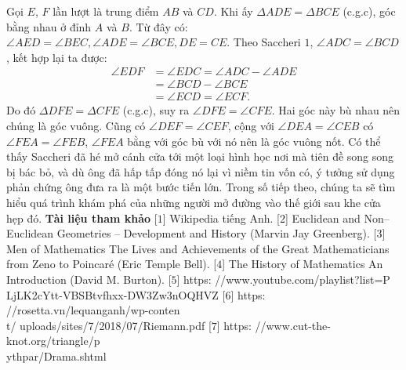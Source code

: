 \begin{multicols}{2}
\begin{figure}[H]
		\vspace*{-10pt}
	\end{figure}
	Gọi $E$, $F$ lần lượt là trung điểm $AB$ và $CD$. Khi ấy $\Delta ADE = \Delta BCE$ (c.g.c), góc bằng nhau ở đỉnh $A$ và $B$. Từ đây có: $ \angle AED = \angle BEC, \angle ADE = \angle BCE, DE = CE$. Theo Saccheri $1$, $ \angle ADC = \angle BCD$, kết hợp lại ta được:
	\begin{align*}
		\angle EDF &= \angle EDC = \angle ADC - \angle ADE \\
		&= \angle BCD - \angle BCE \\
		&= \angle ECD = \angle ECF.
	\end{align*}
	Do đó $ \Delta DFE = \Delta CFE$ (c.g.c), suy ra $ \angle DFE = \angle CFE$. Hai góc này bù nhau nên chúng là góc vuông.
	Cũng có $ \angle DEF = \angle CEF$, cộng với $ \angle DEA = \angle CEB$ có $ \angle FEA = \angle FEB$, $ \angle FEA$ bằng với góc bù với nó nên là góc vuông nốt.
	\vskip 0.1cm
	Có thể thấy Saccheri đã hé mở cánh cửa tới một loại hình học nơi mà tiên đề song song bị bác bỏ, và dù ông đã hấp tấp đóng nó lại vì niềm tin vốn có, ý tưởng sử dụng phản chứng ông đưa ra là một bước tiến lớn. Trong số tiếp theo, chúng ta sẽ tìm hiểu quá trình khám phá của những người mở đường vào thế giới sau khe cửa hẹp đó. 
	\vskip 0.1cm
	\textbf{\color{lichsutoanhoc}Tài liệu tham khảo}
	\vskip 0.1cm
	[$1$] Wikipedia tiếng Anh.
	\vskip 0.1cm
	[$2$] Euclidean and Non--Euclidean Geometries -- Development and History (Marvin Jay Greenberg).
	\vskip 0.1cm
	[$3$] Men of Mathematics The Lives and Achievements of the Great Mathematicians from Zeno to Poincaré (Eric Temple Bell).
	\vskip 0.1cm
	[$4$] The History of Mathematics An Introduction (David M. Burton).
	\vskip 0.1cm
	[$5$] https: //www.youtube.com/playlist?list=P\\LjLK2cYtt-VBSBtvfhxx-DW3Zw3nOQHVZ
	\vskip 0.1cm
	[$6$] https: //rosetta.vn/lequanganh/wp-conten\\t/
	uploads/sites/7/2018/07/Riemann.pdf
	\vskip 0.1cm
	[$7$] https: //www.cut-the-knot.org/triangle/p\\
	ythpar/Drama.shtml
\end{multicols}

